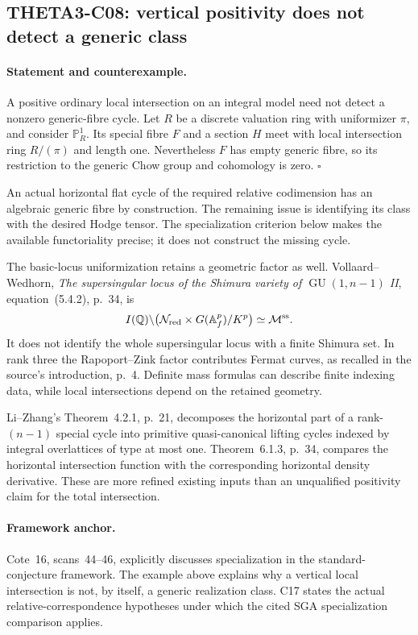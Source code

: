 \subsection{THETA3-C08: vertical positivity does not detect a generic class}\label{C08}

\paragraph{Statement and counterexample.}
A positive ordinary local intersection on an integral model need
not detect a nonzero generic-fibre cycle. Let $R$ be a discrete
valuation ring with uniformizer $\pi$, and consider $\mathbb P^1_R$.
Its special fibre $F$ and a section $H$ meet with local intersection
ring $R/(\pi)$ and length one. Nevertheless $F$ has empty generic
fibre, so its restriction to the generic Chow group and cohomology
is zero. $\square$

An actual horizontal flat cycle of the required relative
codimension has an algebraic generic fibre by construction. The
remaining issue is identifying its class with the desired Hodge
tensor. The specialization criterion below makes the available
functoriality precise; it does not construct the missing cycle.

The basic-locus uniformization retains a geometric factor as well.
Vollaard--Wedhorn, \emph{The supersingular locus of the Shimura
variety of $\operatorname{GU}(1,n-1)$ II}, equation~(5.4.2), p.~34,
is
\[
 I(\mathbb Q)\backslash
 \bigl(\mathcal N_{\mathrm{red}}\times G(\mathbb A_f^p)/K^p\bigr)
 \simeq \mathcal M^{\mathrm{ss}}.
\]
It does not identify the whole supersingular locus with a finite
Shimura set. In rank three the Rapoport--Zink factor contributes
Fermat curves, as recalled in the source's introduction, p.~4.
Definite mass formulas can describe finite indexing data, while
local intersections depend on the retained geometry.

Li--Zhang's Theorem~4.2.1, p.~21, decomposes the horizontal part of
a rank-$(n-1)$ special cycle into primitive quasi-canonical lifting
cycles indexed by integral overlattices of type at most one.
Theorem~6.1.3, p.~34, compares the horizontal intersection function
with the corresponding horizontal density derivative. These are
more refined existing inputs than an unqualified positivity claim
for the total intersection.

\paragraph{Framework anchor.}
Cote~16, scans~44--46, explicitly discusses specialization in the
standard-conjecture framework.  The example above explains why a
vertical local intersection is not, by itself, a generic realization
class.  C17 states the actual relative-correspondence hypotheses under
which the cited SGA specialization comparison applies.

